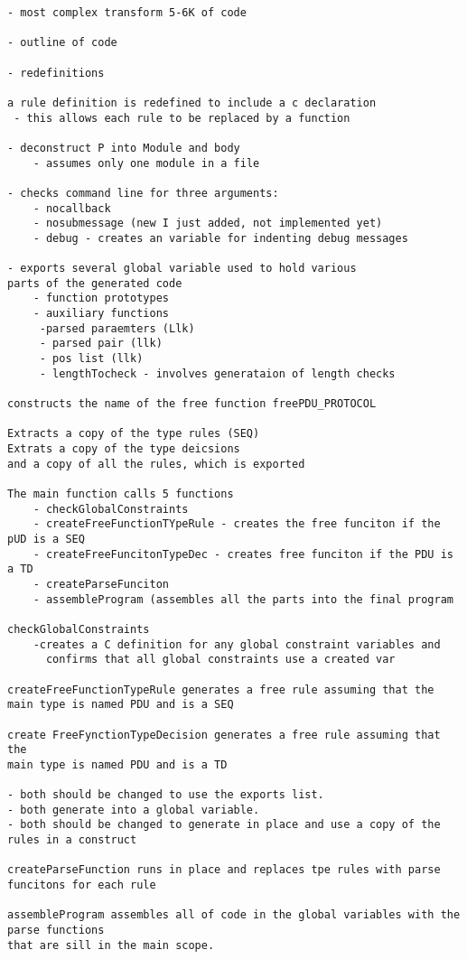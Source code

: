 \documentclass[12pt,oneside,letterpaper]{article}
\begin{document}
\begin{verbatim}
- most complex transform 5-6K of code

- outline of code

- redefinitions

a rule definition is redefined to include a c declaration
 - this allows each rule to be replaced by a function
 
- deconstruct P into Module and body
    - assumes only one module in a file

- checks command line for three arguments:
    - nocallback
    - nosubmessage (new I just added, not implemented yet)
    - debug - creates an variable for indenting debug messages

- exports several global variable used to hold various
parts of the generated code
    - function prototypes
    - auxiliary functions
     -parsed paraemters (Llk)
     - parsed pair (llk)
     - pos list (llk)
     - lengthTocheck - involves generataion of length checks
     
constructs the name of the free function freePDU_PROTOCOL

Extracts a copy of the type rules (SEQ)
Extrats a copy of the type deicsions
and a copy of all the rules, which is exported

The main function calls 5 functions
    - checkGlobalConstraints
    - createFreeFunctionTYpeRule - creates the free funciton if the pUD is a SEQ
    - createFreeFuncitonTypeDec - creates free funciton if the PDU is a TD
    - createParseFunciton
    - assembleProgram (assembles all the parts into the final program

checkGlobalConstraints
    -creates a C definition for any global constraint variables and
      confirms that all global constraints use a created var
      
createFreeFunctionTypeRule generates a free rule assuming that the
main type is named PDU and is a SEQ

create FreeFynctionTypeDecision generates a free rule assuming that the
main type is named PDU and is a TD

- both should be changed to use the exports list.
- both generate into a global variable.
- both should be changed to generate in place and use a copy of the rules in a construct

createParseFunction runs in place and replaces tpe rules with parse funcitons for each rule

assembleProgram assembles all of code in the global variables with the parse functions
that are sill in the main scope.


\end{verbatim}
\end{document}

